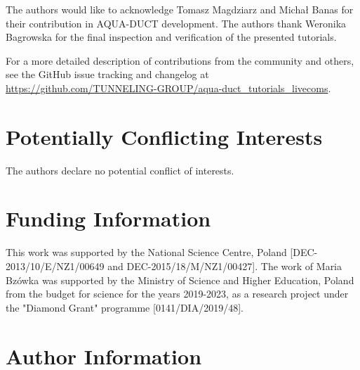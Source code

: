 \documentclass[9pt,tutorial]{livecoms}
\newcommand{\githubrepository}{\url{https://github.com/TUNNELING-GROUP/aqua-duct_tutorials_livecoms}}  %
\begin{document}
The authors would like to acknowledge Tomasz Magdziarz and Michał Banas for their contribution in AQUA-DUCT development. The authors thank Weronika Bagrowska for the final inspection and verification of the presented tutorials.

For a more detailed description of contributions from the community and others, see the GitHub issue tracking and changelog at \githubrepository.

\section{Potentially Conflicting Interests}

The authors declare no potential conflict of interests.

\section{Funding Information}
This work was supported by the National Science Centre, Poland [DEC-2013/10/E/NZ1/00649 and \newline DEC-2015/18/M/NZ1/00427]. \newline
The work of Maria Bzówka was supported by the Ministry of Science and Higher Education, Poland from the budget for science for the years 2019-2023, as a research project under the "Diamond Grant" programme [0141/DIA/2019/48].

\section*{Author Information}
\makeorcid




\end{document}
